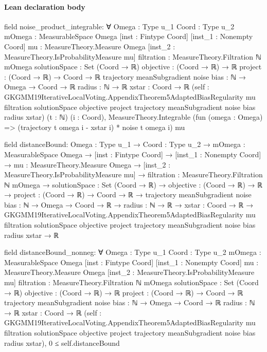 \documentclass[10pt]{article}
\begin{document}
\paragraph{Lean declaration body}
\begin{ReviewVerbatim}
field noise_product_integrable:
∀ {Omega : Type u_1} {Coord : Type u_2} {mOmega : MeasurableSpace Omega} [inst : Fintype Coord]
  [inst_1 : Nonempty Coord] {mu : MeasureTheory.Measure Omega} [inst_2 : MeasureTheory.IsProbabilityMeasure mu]
  {filtration : MeasureTheory.Filtration ℕ mOmega} {solutionSpace : Set (Coord → ℝ)} {objective : (Coord → ℝ) → ℝ}
  {project : (Coord → ℝ) → Coord → ℝ} {trajectory meanSubgradient noise bias : ℕ → Omega → Coord → ℝ} {radius : ℕ → ℝ}
  {xstar : Coord → ℝ}
  (self :
    GKGMM19IterativeLocalVoting.AppendixTheorem5AdaptedBiasRegularity mu filtration solutionSpace objective project
      trajectory meanSubgradient noise bias radius xstar)
  (t : ℕ) (i : Coord),
  MeasureTheory.Integrable (fun (omega : Omega) => (trajectory t omega i - xstar i) * noise t omega i) mu

field distanceBound:
{Omega : Type u_1} →
  {Coord : Type u_2} →
    {mOmega : MeasurableSpace Omega} →
      [inst : Fintype Coord] →
        [inst_1 : Nonempty Coord] →
          {mu : MeasureTheory.Measure Omega} →
            [inst_2 : MeasureTheory.IsProbabilityMeasure mu] →
              {filtration : MeasureTheory.Filtration ℕ mOmega} →
                {solutionSpace : Set (Coord → ℝ)} →
                  {objective : (Coord → ℝ) → ℝ} →
                    {project : (Coord → ℝ) → Coord → ℝ} →
                      {trajectory meanSubgradient noise bias : ℕ → Omega → Coord → ℝ} →
                        {radius : ℕ → ℝ} →
                          {xstar : Coord → ℝ} →
                            GKGMM19IterativeLocalVoting.AppendixTheorem5AdaptedBiasRegularity mu filtration
                                solutionSpace objective project trajectory meanSubgradient noise bias radius xstar →
                              ℝ

field distanceBound_nonneg:
∀ {Omega : Type u_1} {Coord : Type u_2} {mOmega : MeasurableSpace Omega} [inst : Fintype Coord]
  [inst_1 : Nonempty Coord] {mu : MeasureTheory.Measure Omega} [inst_2 : MeasureTheory.IsProbabilityMeasure mu]
  {filtration : MeasureTheory.Filtration ℕ mOmega} {solutionSpace : Set (Coord → ℝ)} {objective : (Coord → ℝ) → ℝ}
  {project : (Coord → ℝ) → Coord → ℝ} {trajectory meanSubgradient noise bias : ℕ → Omega → Coord → ℝ} {radius : ℕ → ℝ}
  {xstar : Coord → ℝ}
  (self :
    GKGMM19IterativeLocalVoting.AppendixTheorem5AdaptedBiasRegularity mu filtration solutionSpace objective project
      trajectory meanSubgradient noise bias radius xstar),
  0 ≤ self.distanceBound


\end{ReviewVerbatim}
\end{document}
